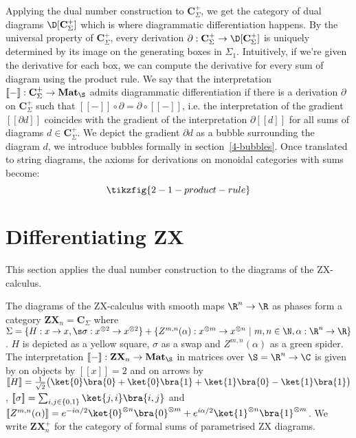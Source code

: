Applying the dual number construction to $\mathbf{C}_\Sigma^+$,
we get the category of dual diagrams $\D[\mathbf{C}_\Sigma^+]$ which is where
diagrammatic differentiation happens.
By the universal property of $\mathbf{C}_\Sigma^+$, every derivation
$\partial : \mathbf{C}_\Sigma^+ \to \D[\mathbf{C}_\Sigma^+]$ is uniquely
determined by its image on the generating boxes in $\Sigma_1$. Intuitively,
if we're given the derivative for each box, we can compute the derivative
for every sum of diagram using the product rule.
We say that the interpretation $[\![-]\!] : \mathbf{C}_\Sigma^+ \to \mathbf{Mat}_\S$
admits diagrammatic differentiation if there is a derivation $\partial$ on
$\mathbf{C}_\Sigma^+$ such that
$[\![-]\!] \circ \partial = \partial \circ [\![-]\!]$, i.e. the interpretation
of the gradient $[\![\partial d]\!]$ coincides with the gradient of the
interpretation $\partial [\![d]\!]$ for all sums of diagrams $d \in
\mathbf{C}_\Sigma^+$. We depict the gradient $\partial d$ as a
bubble surrounding the diagram $d$, we introduce bubbles formally in
section~\ref{4-bubbles}.
Once translated to string diagrams, the axioms for derivations on monoidal
categories with sums become:
$$\tikzfig{2-1-product-rule}$$

\section{Differentiating ZX}\label{2b-differentiating-zx}

This section applies the dual number construction to the diagrams of the ZX-calculus.

\begin{definition}
The diagrams of the ZX-calculus with smooth maps $\R^n \to \R$ as phases
form a category $\mathbf{ZX}_n = \mathbf{C}_\Sigma$ where
$\Sigma = \{ H : x \to x, \s \sigma : x^{\otimes 2} \to x^{\otimes 2} \}
+ \{ Z^{m, n}(\alpha) : x^{\otimes m} \to x^{\otimes n}
\ \vert \ m, n \in \N, \alpha : \R^n \to \R \}$.
$H$ is depicted as a yellow square, $\sigma$ as a swap and $Z^{m, n}(\alpha)$
as a green spider.
The interpretation $[\![-]\!]  : \mathbf{ZX}_n \to \mathbf{Mat}_\S$
in matrices over $\S = \R^n \to \C$ is given by on objects by $[\![x]\!] = 2$
and on arrows by $[\![H]\!] = \frac{1}{\sqrt{2}} \big(
\ket{0}\bra{0} + \ket{0}\bra{1} + \ket{1}\bra{0} - \ket{1}\bra{1}\big)$,
$[\![\sigma]\!] = \sum_{i,j \in \{ 0, 1 \}} \ket{j, i}\bra{i, j}$
and $[\![Z^{m, n}(\alpha)]\!] =
e^{-i \alpha / 2} \ket{0}^{\otimes n} \bra{0}^{\otimes m}
+ e^{i \alpha / 2} \ket{1}^{\otimes n} \bra{1}^{\otimes m}$.
We write $\mathbf{ZX}_n^+$ for the category of formal sums of parametrised
ZX diagrams.
\end{definition}

